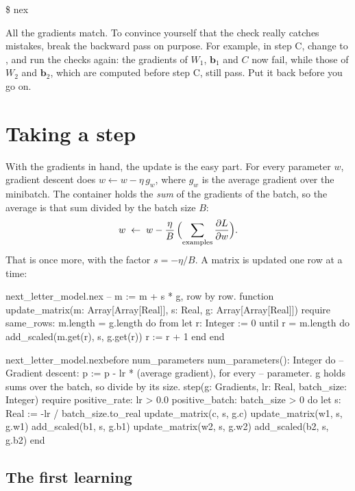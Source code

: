 \documentclass[11pt,a4paper,oneside,openany]{book}
\newcommand{\runoutput}[2]{%
  \begin{tcolorbox}[outbox]
  {\ttfamily\footnotesize\color{outfg}\$ nex \detokenize{#1}}\par\vspace{2pt}
  
  \end{tcolorbox}}
\newcommand{\code}[1]{\texttt{\detokenize{#1}}}
\newcommand{\vect}[1]{\mathbf{#1}}
\newcommand{\pd}[2]{\frac{\partial #1}{\partial #2}}
\begin{document}
\runoutput{checks.nex}{checks_gradients}

All the gradients match. To convince yourself that the check really
catches mistakes, break the backward pass on purpose. For example, in
step C, change \code{(1.0 - hj * hj)} to \code{(1.0 - hj)}, and run the
checks again: the gradients of $W_1$, $\vect{b}_1$ and $C$ now fail,
while those of $W_2$ and $\vect{b}_2$, which are computed before step C,
still pass. Put it back before you go on.

\chapter{Taking a step}

With the gradients in hand, the update is the easy part. For every
parameter $w$, gradient descent does $w \leftarrow w - \eta\,g_w$, where
$g_w$ is the average gradient over the minibatch. The container holds the
\emph{sum} of the gradients of the batch, so the average is that sum
divided by the batch size $B$:
\[
  w \;\leftarrow\; w - \frac{\eta}{B}\,\Bigl(\sum_{\text{examples}} \pd{L}{w}\Bigr).
\]
That is \code{add_scaled} once more, with the factor $s = -\eta/B$. A
matrix is updated one row at a time:

\begin{append}{next_letter_model.nex}
-- m := m + s * g, row by row.
function update_matrix(m: Array[Array[Real]], s: Real, g: Array[Array[Real]])
require
  same_rows: m.length = g.length
do
  from
    let r: Integer := 0
  until
    r = m.length
  do
    add_scaled(m.get(r), s, g.get(r))
    r := r + 1
  end
end
\end{append}

\begin{addbefore}{next_letter_model.nex}{before num_parameters}{  num_parameters(): Integer do}
  -- Gradient descent: p := p - lr * (average gradient), for every
  -- parameter. g holds sums over the batch, so divide by its size.
  step(g: Gradients, lr: Real, batch_size: Integer)
  require
    positive_rate: lr > 0.0
    positive_batch: batch_size > 0
  do
    let s: Real := -lr / batch_size.to_real
    update_matrix(c, s, g.c)
    update_matrix(w1, s, g.w1)
    add_scaled(b1, s, g.b1)
    update_matrix(w2, s, g.w2)
    add_scaled(b2, s, g.b2)
  end
\end{addbefore}

\section{The first learning}
\end{document}
